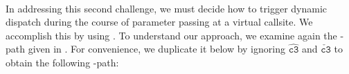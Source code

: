 \begin{comment}
i.e., associating the value flow of arguments with that of receiver variables, by enforcing the value flows from arguments (return values) to their corresponding receiver variables with specially designed \pag edges, i.e., \store[i] and \load[\texttt{ret}], added via \rulename{C-VCall}. Generally, dynamic dispatching values from an argument $a_i$ to a formal parameter $p_i^{m'}$ dependents on $t$ (the dynamic types of the receiver objects), $\texttt{m}$ (the signature of the invoking method), and $i$ (the identifier of the argument it self).   While the later two could be obtained at hand at a callsite, the receiver objects and the receiver variable $a_0$ could be further apart in the program, separated by a long sequence of method calls (with complex field accesses). 
\end{comment}

\paragraph{ \label{paragraph:chl2}} In addressing this second  challenge, we must decide
how to trigger dynamic dispatch during the course of 
parameter passing at a virtual callsite.  We accomplish this by using
\capLFC. To understand our approach, we examine again the \LFCR-path given in
. For convenience, we duplicate it below
by ignoring $\hat{\boxed{\texttt{c3}}}$ and 
$\check{\boxed{\texttt{c3}}}$ to obtain the following
\LFC-path:

